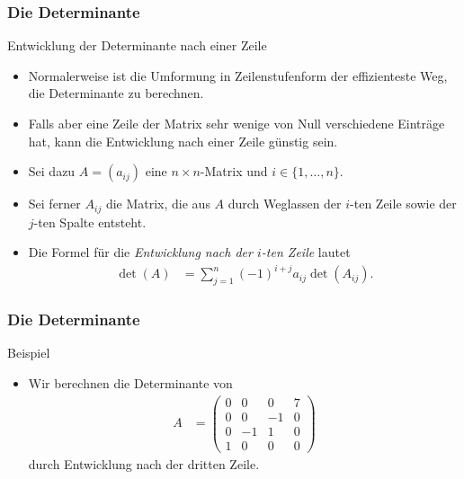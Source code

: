 \documentclass{beamer}
\renewcommand{\emph}[1]{{\textcolor{solarizedRed}{\itshape #1}}}
\renewcommand{\ae}{\"a}
\newcommand{\ue}{\"u}
\newcommand{\mytitle}{Die Determinante}
\begin{document}
\begin{frame}\frametitle{\mytitle}
	\begin{block}{Entwicklung der Determinante nach einer Zeile}
		\begin{itemize}
	\item Normalerweise ist die Umformung in Zeilenstufenform der effizienteste Weg, die Determinante zu berechnen.
	\item Falls aber eine Zeile der Matrix sehr wenige von Null verschiedene Eintr\ae ge hat, kann die Entwicklung nach einer Zeile g\ue nstig sein.
	\item Sei dazu $A=(a_{ij})$ eine $n\times n$-Matrix und $i\in\{1,\ldots,n\}$.
	\item Sei ferner $A_{ij}$ die Matrix, die aus $A$ durch Weglassen der $i$-ten Zeile sowie der $j$-ten Spalte entsteht.
	\item Die Formel f\ue r die \emph{Entwicklung nach der $i$-ten Zeile} lautet
		\begin{align*}
			\det(A)&=\sum_{j=1}^n(-1)^{i+j}a_{ij}\det(A_{ij}).
		\end{align*}
		\end{itemize}
	\end{block}
\end{frame}

\begin{frame}\frametitle{\mytitle}
	\begin{block}{Beispiel}
		\begin{itemize}
			\item Wir berechnen die Determinante von
				\begin{align*}
					A&=\begin{pmatrix}
						0&0&0&7\\0&0&-1&0\\0&-1&1&0\\1&0&0&0
					\end{pmatrix}
				\end{align*}
				durch Entwicklung nach der dritten Zeile.
		\end{itemize}
	\end{block}
\end{frame}
\end{document}
